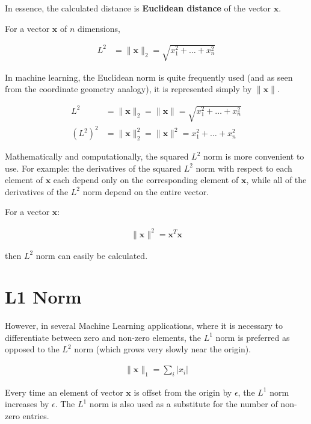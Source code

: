 In essence, the calculated distance is \textbf{Euclidean distance} of the vector \(\mathbf{x}\).
\para

For a vector \(\mathbf{x}\) of \(n\) dimensions,

\begin{align}
L^{2} &= \|\mathbf{x}\|_2 = \sqrt{x_{1}^2 + \dots + x_{n}^2}
\end{align}
\para

In machine learning, the Euclidean norm is quite frequently used (and as seen from the coordinate geometry analogy), it is represented simply by \(\|\mathbf{x}\|\).
\para

\begin{align}
L^{2} &= \|\mathbf{x}\|_2 = \|\mathbf{x}\| = \sqrt{x_{1}^2 + \dots + x_{n}^2} \\
\left( L^{2} \right) ^{2} &= \|\mathbf{x}\|_2^2 = \|\mathbf{x}\|^{2} = x_{1}^2 + \dots + x_{n}^2
\end{align}
\para

Mathematically and computationally, the squared \(L^{2}\) norm is more convenient to use. For example: the derivatives of the squared \(L^{2}\) norm with respect to each element of \(\mathbf{x}\) each depend only on the corresponding element of \(\mathbf{x}\), while all of the derivatives of the \(L^{2}\) norm depend on the entire vector.
\para

For a vector \(\mathbf{x}\):

\begin{align}
\|\mathbf{x}\|^2 = \mathbf{x}^{T}\mathbf{x}
\end{align}
\para

then \(L^{2}\) norm can easily be calculated.

\clearpage
\newpage

\section{L1 Norm}

However, in several Machine Learning applications, where it is necessary to differentiate between zero and non-zero elements, the \(L^{1}\) norm is preferred as opposed to the \(L^{2}\) norm (which grows very slowly near the origin).
\para

\begin{align}
\|\mathbf{x}\|_{1} = \sum_{i} \left| x_{i} \right|
\end{align}
\para

Every time an element of vector \(\mathbf{x}\) is offset from the origin by \(\epsilon\), the \(L^{1}\) norm increases by \(\epsilon\). The \(L^{1}\) norm is also used as a substitute for the number of non-zero entries.

